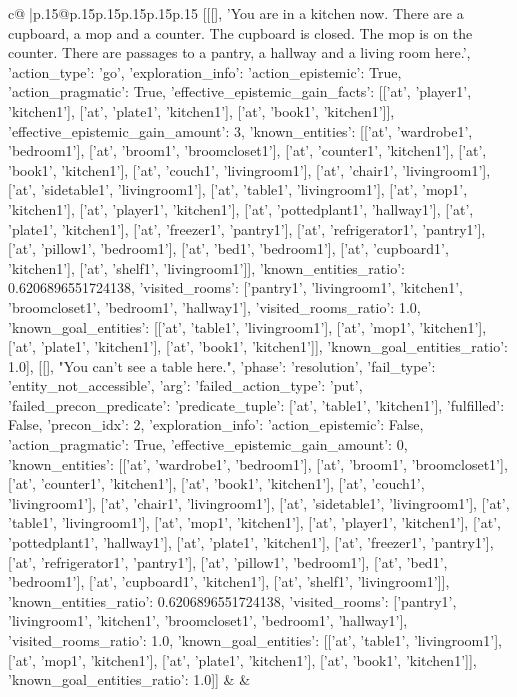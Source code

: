 \documentclass{article}
\begin{document}
{\begin{supertabular}{c@{$\;$}|p{.15\linewidth}@{}p{.15\linewidth}p{.15\linewidth}p{.15\linewidth}p{.15\linewidth}p{.15\linewidth}}
{{{	 [[[], 'You are in a kitchen now. There are a cupboard, a mop and a counter. The cupboard is closed. The mop is on the counter. There are passages to a pantry, a hallway and a living room here.', {'action_type': 'go', 'exploration_info': {'action_epistemic': True, 'action_pragmatic': True, 'effective_epistemic_gain_facts': [['at', 'player1', 'kitchen1'], ['at', 'plate1', 'kitchen1'], ['at', 'book1', 'kitchen1']], 'effective_epistemic_gain_amount': 3, 'known_entities': [['at', 'wardrobe1', 'bedroom1'], ['at', 'broom1', 'broomcloset1'], ['at', 'counter1', 'kitchen1'], ['at', 'book1', 'kitchen1'], ['at', 'couch1', 'livingroom1'], ['at', 'chair1', 'livingroom1'], ['at', 'sidetable1', 'livingroom1'], ['at', 'table1', 'livingroom1'], ['at', 'mop1', 'kitchen1'], ['at', 'player1', 'kitchen1'], ['at', 'pottedplant1', 'hallway1'], ['at', 'plate1', 'kitchen1'], ['at', 'freezer1', 'pantry1'], ['at', 'refrigerator1', 'pantry1'], ['at', 'pillow1', 'bedroom1'], ['at', 'bed1', 'bedroom1'], ['at', 'cupboard1', 'kitchen1'], ['at', 'shelf1', 'livingroom1']], 'known_entities_ratio': 0.6206896551724138, 'visited_rooms': ['pantry1', 'livingroom1', 'kitchen1', 'broomcloset1', 'bedroom1', 'hallway1'], 'visited_rooms_ratio': 1.0, 'known_goal_entities': [['at', 'table1', 'livingroom1'], ['at', 'mop1', 'kitchen1'], ['at', 'plate1', 'kitchen1'], ['at', 'book1', 'kitchen1']], 'known_goal_entities_ratio': 1.0}}], [[], "You can't see a table here.", {'phase': 'resolution', 'fail_type': 'entity_not_accessible', 'arg': {'failed_action_type': 'put', 'failed_precon_predicate': {'predicate_tuple': ['at', 'table1', 'kitchen1'], 'fulfilled': False, 'precon_idx': 2}}, 'exploration_info': {'action_epistemic': False, 'action_pragmatic': True, 'effective_epistemic_gain_amount': 0, 'known_entities': [['at', 'wardrobe1', 'bedroom1'], ['at', 'broom1', 'broomcloset1'], ['at', 'counter1', 'kitchen1'], ['at', 'book1', 'kitchen1'], ['at', 'couch1', 'livingroom1'], ['at', 'chair1', 'livingroom1'], ['at', 'sidetable1', 'livingroom1'], ['at', 'table1', 'livingroom1'], ['at', 'mop1', 'kitchen1'], ['at', 'player1', 'kitchen1'], ['at', 'pottedplant1', 'hallway1'], ['at', 'plate1', 'kitchen1'], ['at', 'freezer1', 'pantry1'], ['at', 'refrigerator1', 'pantry1'], ['at', 'pillow1', 'bedroom1'], ['at', 'bed1', 'bedroom1'], ['at', 'cupboard1', 'kitchen1'], ['at', 'shelf1', 'livingroom1']], 'known_entities_ratio': 0.6206896551724138, 'visited_rooms': ['pantry1', 'livingroom1', 'kitchen1', 'broomcloset1', 'bedroom1', 'hallway1'], 'visited_rooms_ratio': 1.0, 'known_goal_entities': [['at', 'table1', 'livingroom1'], ['at', 'mop1', 'kitchen1'], ['at', 'plate1', 'kitchen1'], ['at', 'book1', 'kitchen1']], 'known_goal_entities_ratio': 1.0}}]] 
	  } 
	   } 
	   } 
	 & & \\ 
 


\end{supertabular}}
\end{document}
